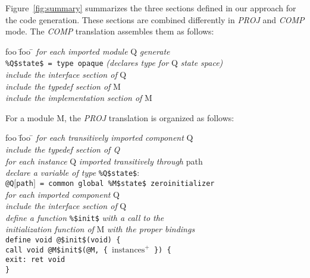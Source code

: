 \documentclass{article}
\newcommand{\llvm}[1]{\texttt{#1}}
\newcommand{\B}[1]{\textsf{#1}}
\newcommand{\ListOf}[1]{$\mbox{#1}^+$}
\begin{document}
Figure~\ref{fig:summary} summarizes the three sections defined in our approach
for the code generation. These sections are combined differently in
\emph{PROJ\/} and \emph{COMP\/} mode. The \emph{COMP\/} translation assembles
them as follows:
\begin{center}
  \begin{tabbing}
    foo \= foo \= \kill
    \textit{for each imported module} \B{Q} \textit{generate} \\
    \> \llvm{\%Q\$state\$ = type opaque} \quad \textit{(declares type for} \B{Q} \textit{state space)} \\
    \> \textit{include the interface section of }\B{Q} \\
    \textit{include the typedef section of} \B{M} \\
    \textit{include the implementation section of} \B{M}
  \end{tabbing}
\end{center}
For a module \B{M}, the \emph{PROJ\/} translation is organized as follows:
\begin{center}
  \begin{tabbing}
    foo \= foo \= \kill
    \textit{for each transitively imported component} \B{Q} \\
    \> \textit{include the typedef section of \B{Q}} \\
    \textit{for each instance} \B{Q} \textit{imported transitively through} \B{path} \\
    \> \textit{declare a variable of type} \llvm{\%Q\$state\$}: \\
    \> \llvm{@Q$\lbrack$path$\rbrack$ = common global \%M\$state\$ zeroinitializer} \\

    \textit{for each imported component} \B{Q} \\
    \> \textit{include the interface section of} \B{Q} \\
    \textit{define a function} \llvm{\%\$init\$} \textit{with a call to the } \\
    \> \textit{initialization function of} \B{M} \textit{with the proper bindings} \\
    \> \llvm{define void @\$init\$(void) \{} \\
    \> \> \llvm{call void @M\$init\$(@M, \{ \ListOf{instances} \}) \{} \\
    \> \> \llvm{exit: ret void} \\
    \> \llvm{\}} \\
    \>
  \end{tabbing}
\end{center}
\end{document}
